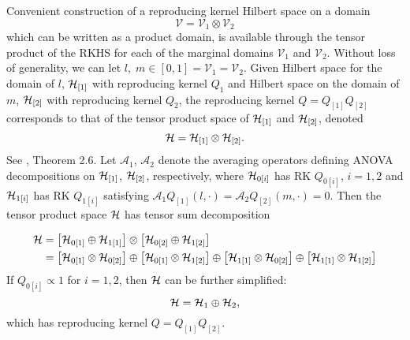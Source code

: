 Convenient construction of a reproducing kernel Hilbert space on a domain
\[
\mathcal{V} = \mathcal{V}_1 \otimes \mathcal{V}_2
\]
\noindent
which can be written as a product domain, is available through the tensor product of the RKHS for each of the marginal domains $\mathcal{V}_1$ and $\mathcal{V}_2$. Without loss of generality, we can let $l,\;m \in \left[0,1\right] = \mathcal{V}_1 = \mathcal{V}_2$. Given Hilbert space for the domain of $l$, $\mathcal{H}_{\left[1\right]}$ with reproducing kernel $Q_1$ and Hilbert space on the domain of $m$, $\mathcal{H}_{\left[2\right]}$ with reproducing kernel $Q_2$, the reproducing kernel $Q = Q_{\left[1\right]}Q_{\left[2\right]}$ corresponds to that of the tensor product space of $\mathcal{H}_{\left[1\right]}$ and $\mathcal{H}_{\left[2\right]}$, denoted
\[
\mathcal{H} = \mathcal{H}_{\left[1\right]} \otimes \mathcal{H}_{\left[2\right]}.
\]
\noindent
See \cite{gu2002smoothing}, Theorem 2.6. Let $\mathcal{A}_1$, $\mathcal{A}_2$ denote the averaging operators defining ANOVA decompositions on $\mathcal{H}_{\left[1\right]}$, $\mathcal{H}_{\left[2\right]}$, respectively, where $\mathcal{H}_{0\left[i\right]}$ has RK $Q_{0\left[i\right]}$, $i = 1, 2$ and $\mathcal{H}_{1\left[i\right]}$ has RK $Q_{1\left[i\right]}$ satisfying $\mathcal{A}_1Q_{\left[1\right]}\left(l,\cdot\right) = \mathcal{A}_2Q_{\left[2\right]}\left(m,\cdot\right) = 0$. Then the tensor product space $\mathcal{H}$ has tensor sum decomposition

\begin{align} 
\begin{split} \label{eq:tensor-sum-decomposition}
\mathcal{H} &= \left[\mathcal{H}_{0\left[1\right]} \oplus \mathcal{H}_{1\left[1\right]} \right] \otimes \left[\mathcal{H}_{0\left[2\right]} \oplus \mathcal{H}_{1\left[2\right]} \right] \\
&= \left[\mathcal{H}_{0\left[1\right]} \otimes  \mathcal{H}_{0\left[2\right]}\right] \oplus \left[\mathcal{H}_{0\left[1\right]} \otimes \mathcal{H}_{1\left[2\right]}\right] \oplus \left[\mathcal{H}_{1\left[1\right]} \otimes  \mathcal{H}_{0\left[2\right]}\right] \oplus \left[\mathcal{H}_{1\left[1\right]} \otimes  \mathcal{H}_{1\left[2\right]}\right] 
\end{split}
\end{align}
\noindent
If $Q_{0\left[i\right]} \propto 1$ for $i = 1,2$, then $\mathcal{H}$ can be further simplified:
\begin{equation}
\mathcal{H} = \mathcal{H}_1 \oplus \mathcal{H}_2,
\end{equation}
\noindent
which has reproducing kernel $Q = Q_{\left[1\right]}Q_{\left[2\right]}$.

